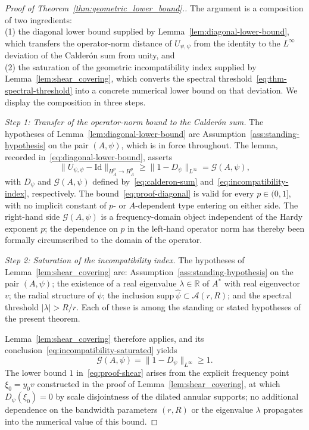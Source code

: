 \documentclass[pdflatex,sn-basic,Numbered]{sn-jnl}
\theoremstyle{thmstyleone}%
\theoremstyle{thmstylethree}%
\begin{document}
\begin{proof}[Proof of Theorem~\ref{thm:geometric_lower_bound}.]
	The argument is a composition of two ingredients:\\
	(1) the diagonal lower bound
	supplied by Lemma~\ref{lem:diagonal-lower-bound}, which
	transfers the operator-norm distance of $U_{\psi,\psi}$ from the identity
	to the $L^\infty$ deviation of the Calder\'on sum from unity, and\\
	(2) the saturation of the geometric incompatibility index supplied by
	Lemma~\ref{lem:shear_covering}, which converts the spectral
	threshold~\eqref{eq:thm-spectral-threshold} into a concrete numerical lower
	bound on that deviation. We display the composition in three steps.
	
	\medskip
	\emph{Step 1: Transfer of the operator-norm bound to the Calder\'on sum.}
	The hypotheses of Lemma~\ref{lem:diagonal-lower-bound} are
	Assumption~\ref{ass:standing-hypothesis} on the pair $(A, \psi)$, which is
	in force throughout. The lemma, recorded
	in~\eqref{eq:diagonal-lower-bound}, asserts
	\begin{equation}\label{eq:proof-diagonal}
		\bigl\| U_{\psi,\psi} - \mathrm{Id} \bigr\|_{H^p_A \to H^p_A}
		 \ge  \bigl\| 1 - D_{\psi} \bigr\|_{L^\infty}
		 =  \mathcal{G}(A, \psi),
	\end{equation}
	with $D_\psi$ and $\mathcal{G}(A, \psi)$ defined by~\eqref{eq:calderon-sum}
	and~\eqref{eq:incompatibility-index}, respectively. The
	bound~\eqref{eq:proof-diagonal} is valid for every $p \in (0, 1]$, with no
	implicit constant of $p$- or $A$-dependent type entering on either side.
	The right-hand side $\mathcal{G}(A, \psi)$ is a frequency-domain object
	independent of the Hardy exponent $p$; the dependence on $p$ in the
	left-hand operator norm has thereby been formally circumscribed to the
	domain of the operator.
	
	\medskip
	\emph{Step 2: Saturation of the incompatibility index.}
	The hypotheses of Lemma~\ref{lem:shear_covering} are:
	Assumption~\ref{ass:standing-hypothesis} on the pair $(A, \psi)$; the
	existence of a real eigenvalue $\lambda \in \mathbb{R}$ of $A^{*}$ with
	real eigenvector $v$; the radial structure of $\psi$; the inclusion
	$\mathrm{supp}\, \widehat{\psi} \subset \mathcal{A}(r, R)$; and the
	spectral threshold $|\lambda| > R/r$. Each of these is among the standing
	or stated hypotheses of the present theorem.
	
	Lemma~\ref{lem:shear_covering} therefore applies, and its
	conclusion~\eqref{eq:incompatibility-saturated} yields
	\begin{equation}\label{eq:proof-shear}
		\mathcal{G}(A, \psi)
		 =  \bigl\| 1 - D_{\psi} \bigr\|_{L^\infty}
		 \ge  1 .
	\end{equation}
	The lower bound $1$ in~\eqref{eq:proof-shear} arises from the explicit
	frequency point $\xi_0 = y_0 v$ constructed in the proof of
	Lemma~\ref{lem:shear_covering}, at which $D_\psi(\xi_0) = 0$ by scale
	disjointness of the dilated annular supports; no additional dependence on
	the bandwidth parameters $(r, R)$ or the eigenvalue $\lambda$ propagates
	into the numerical value of this bound.
	

\end{proof}
\end{document}
